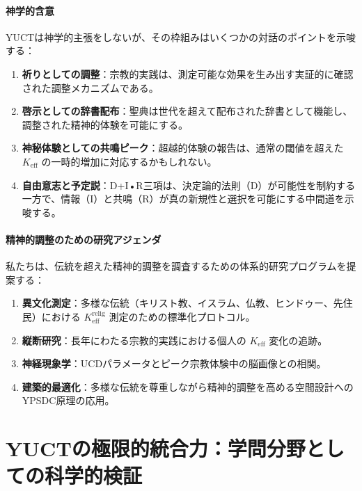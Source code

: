 \documentclass[12pt,a4paper]{article}
\begin{document}
	\subsection{神学的含意}
	
	YUCTは神学的主張をしないが、その枠組みはいくつかの対話のポイントを示唆する：
	\begin{enumerate}
		\item \textbf{祈りとしての調整}：宗教的実践は、測定可能な効果を生み出す実証的に確認された調整メカニズムである。
		
		\item \textbf{啓示としての辞書配布}：聖典は世代を超えて配布された辞書として機能し、調整された精神的体験を可能にする。
		
		\item \textbf{神秘体験としての共鳴ピーク}：超越的体験の報告は、通常の閾値を超えた \(K_{\mathrm{eff}}\) の一時的増加に対応するかもしれない。
		
		\item \textbf{自由意志と予定説}：D+I•R三項は、決定論的法則（D）が可能性を制約する一方で、情報（I）と共鳴（R）が真の新規性と選択を可能にする中間道を示唆する。
	\end{enumerate}
	
	\subsection{精神的調整のための研究アジェンダ}
	
	私たちは、伝統を超えた精神的調整を調査するための体系的研究プログラムを提案する：
	\begin{enumerate}
		\item \textbf{異文化測定}：多様な伝統（キリスト教、イスラム、仏教、ヒンドゥー、先住民）における $K_{\mathrm{eff}}^{\mathrm{relig}}$ 測定のための標準化プロトコル。
		
		\item \textbf{縦断研究}：長年にわたる宗教的実践における個人の $K_{\mathrm{eff}}$ 変化の追跡。
		
		\item \textbf{神経現象学}：UCDパラメータとピーク宗教体験中の脳画像との相関。
		
		\item \textbf{建築的最適化}：多様な伝統を尊重しながら精神的調整を高める空間設計へのYPSDC原理の応用。
	\end{enumerate}
	
	\newpage
	\part{YUCTの極限的統合力：学問分野としての科学的検証}
	
\end{document}
